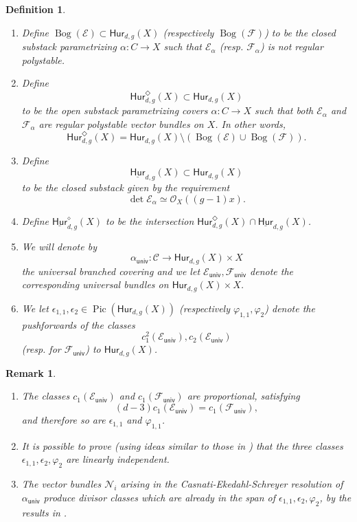 \documentclass[reqno, 11pt]{amsart}
\newtheorem{definition}[theorem]{Definition}
\newtheorem{remark}[theorem]{Remark}
\DeclareMathOperator{\Pic}{Pic}
\renewcommand{\O}{\mathcal{O}}
\newcommand{\HdgX}{\mathsf{Hur}_{d,g}(X)}
\newcommand{\St}{\mathsf{Hur}_{d,g}^{\Diamond}(X)}
\DeclareMathOperator{\univ}{\mathsf{univ}}
\DeclareMathOperator{\Bog}{Bog}
\newcommand{\Hurfixed}[2]{\underline{\mathsf{Hur}}_{#1,#2}}
\newcommand{\Hurfixedstable}[2]{\underline{\mathsf{Hur}}_{#1,#2}^{\diamond}}
\begin{document}
\begin{definition}
  \begin{enumerate}
     \item Define $\Bog(\mathcal{E}) \subset \HdgX$ (respectively $\Bog(\mathcal{F})$) to be the closed substack parametrizing $\alpha: C \to X$ such that $\mathcal{E}_{\alpha}$ (resp. $\mathcal{F}_{\alpha}$) is not regular polystable. 
     \item Define \[\St \subset \HdgX\] to be the open substack parametrizing covers $\alpha: C \to X$ such that both $\mathcal{E}_{\alpha}$ and $\mathcal{F}_{\alpha}$ are regular polystable vector bundles on $X$. In other words, \[\St = \HdgX \setminus (\Bog(\mathcal{E}) \cup \Bog(\mathcal{F})).\]
     \item Define \[\Hurfixed{d}{g}(X) \subset \HdgX\] to be the closed substack given by the requirement \[\det \mathcal{E}_{\alpha} \simeq \O_{X}((g-1)x).\] 
      \item Define $\Hurfixedstable{d}{g}(X)$ to be the intersection $\St \cap \Hurfixed{d}{g}(X)$.
     \item We will denote by \[\alpha_{\univ}: \mathcal{C} \to \HdgX \times X\] the universal branched covering and we let $\mathcal{E}_{\univ}, \mathcal{F}_{\univ}$ denote the corresponding universal bundles on $\HdgX \times X$. 
     \item We let $\epsilon_{1,1}, \epsilon_{2} \in \Pic(\HdgX)$ (respectively $\varphi_{1,1}, \varphi_{2}$) denote the pushforwards of the classes \[c_{1}^{2}(\mathcal{E}_{\univ}), c_{2}(\mathcal{E}_{\univ})\] (resp. for $\mathcal{F}_{\univ}$) to $\HdgX$.
     \end{enumerate}
\end{definition}

 

\begin{remark}
    \label{remark:linearlyindependent}
    \begin{enumerate}
    \item The classes $c_{1}(\mathcal{E}_{\univ})$ and $c_{1}(\mathcal{F}_{\univ})$ are proportional, satisfying $$(d-3)c_{1}(\mathcal{E}_{\univ}) = c_{1}(\mathcal{F}_{\univ}),$$ and therefore so are $\epsilon_{1,1}$ and $\varphi_{1,1}$. 
    \item It is possible to prove (using ideas similar to those in \cite[Section 2.2]{deopurkar2015picard}) that the three classes $\epsilon_{1,1}, \epsilon_{2}, \varphi_{2}$ are linearly independent.  
    \item The vector bundles $\mathcal{N}_{i}$ arising in the Casnati-Ekedahl-Schreyer resolution of $\alpha_{\univ}$ produce divisor classes which are already in the span of $\epsilon_{1,1}, \epsilon_{2}, \varphi_{2}$, by the results in \cite{deopurkar2018syzygy}. 
    \end{enumerate}
\end{remark}
\end{document}
